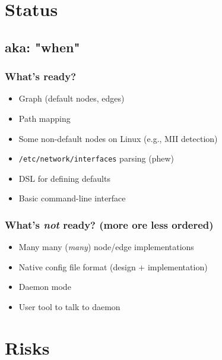 \documentclass[ignorenonframetext]{beamer}
\begin{document}
\section{Status}
\subsection{aka: "when"}
\begin{frame}
  \frametitle{What's ready?}
  \begin{itemize}
    \item Graph (default nodes, edges)
    \item Path mapping
    \item Some non-default nodes on Linux (e.g., MII detection)
    \item \texttt{/etc/network/interfaces} parsing (phew)
    \item DSL for defining defaults
    \item Basic command-line interface
  \end{itemize}
\end{frame}

\begin{frame}
  \frametitle{What's \emph{not} ready? (more ore less ordered)}
  \begin{itemize}
    \item Many many (\emph{many}) node/edge implementations
    \item Native config file format (design + implementation)
    \item Daemon mode
    \item User tool to talk to daemon
  \end{itemize}
\end{frame}

\section{Risks}
\end{document}
